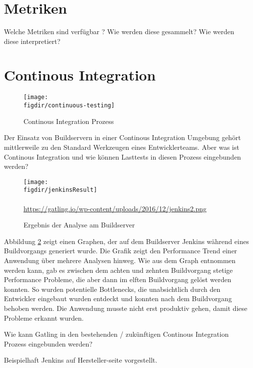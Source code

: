 \section{Metriken}

Welche Metriken sind verfügbar ?
Wie werden diese gesammelt?
Wie werden diese interpretiert?




\section{Continous Integration}

\begin{figure}
	{\caption{Continous Integration Prozess}
		\label{fig:continousIntegration}}
	{\texttt{[image: \\figdir/continuous-testing]}}
\end{figure}


Der Einsatz von Buildservern in einer Continous Integration Umgebung gehört mittlerweile zu den Standard Werkzeugen eines Entwicklerteams. Aber was ist Continous Integration und wie können Lasttests in diesen Prozess eingebunden werden?

\begin{figure}
	{\caption{Ergebnis der Analyse am Buildserver}
		\label{fig:jenkinsBuildResult}}
	{\texttt{[image: \\figdir/jenkinsResult]}}\\~\\
				\tiny{\quelle\url{https://gatling.io/wp-content/uploads/2016/12/jenkins2.png}}
\end{figure}
Abbildung \ref{fig:jenkinsBuildResult} zeigt einen Graphen, der auf dem Buildserver \glqq Jenkins\grqq{} während eines Buildvorgangs generiert wurde. Die Grafik zeigt den \glqq Performance Trend\grqq{} einer Anwendung über mehrere Analysen hinweg. Wie aus dem Graph entnommen werden kann, gab es zwischen dem achten und zehnten Buildvorgang stetige Performance Probleme, die aber dann im elften Buildvorgang gelöst werden konnten. So wurden potentielle Bottlenecks, die unabsichtlich durch den Entwickler eingebaut wurden entdeckt und konnten nach dem Buildvorgang behoben werden. Die Anwendung musste nicht erst produktiv gehen, damit diese Probleme erkannt wurden.

Wie kann Gatling in den bestehenden / zukünftigen Continous Integration Prozess eingebunden werden?

Beispielhaft Jenkins auf Hersteller-seite vorgestellt.



